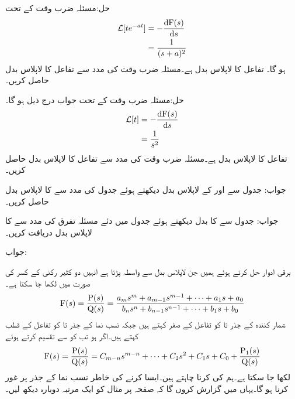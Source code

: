 حل:مسئلہ ضرب وقت کے  تحت
\begin{align*}
\Laplace[te^{-at}] &=-\frac{\dif \bF(s)}{\dif s}\\
&=\frac{1}{(s+a)^2}
\end{align*}
ہو گا۔
تفاعل  کا لاپلاس بدل  ہے۔مسئلہ ضرب وقت کی مدد سے تفاعل  کا  لاپلاس بدل حاصل کریں۔

حل:مسئلہ ضرب وقت کے تحت جواب درج ذیل ہو گا۔
\begin{align*}
\Laplace[t]&=-\frac{\dif \bF(s)}{\dif s}\\
&=\frac{1}{s^2}
\end{align*}
تفاعل  کا لاپلاس بدل  ہے۔مسئلہ ضرب وقت کی مدد سے تفاعل  کا لاپلاس بدل حاصل کریں۔

جواب:
جدول  سے  اور  کے لاپلاس بدل دیکھتے ہوئے جدول   کی مدد سے  کا لاپلاس بدل حاصل کریں۔

جواب:
جدول  سے  کا بدل دیکھتے ہوئے جدول   میں دئے مسئلہ تفرق کی مدد سے  کا لاپلاس بدل دریافت کریں۔

جواب:

برقی ادوار حل کرتے ہوئے ہمیں جن لاپلاس بدل سے واسطہ پڑتا ہے انہیں دو کثیر رکنی کے کسر کی صورت میں لکھا جا سکتا ہے۔
\begin{align}\label{مساوات_لاپلاس_عمومی_الف}
{\ensuremath{{\textup{F}}}}(s)=\frac{{{\textup{P}}}(s)}{{{\textup{Q}}}(s)}=\frac{a_m s^m+a_{m-1} s^{m-1}+\cdots+a_1 s+a_0}{b_n s^n+b_{n-1} s^{n-1}+\cdots+b_1 s+b_0}
\end{align}
شمار کنندہ  کے جذر  تا   کو تفاعل کے صفر کہتے ہیں جبکہ نسب نما  کے جذر   تا  کو تفاعل کے قطب کہتے ہیں۔اگر  ہو تب  کو  سے تقسیم کرتے ہوئے
\begin{align}\label{مساوات_لاپلاس_عمومی_ب}
{\ensuremath{{\textup{F}}}}(s)=\frac{{{\textup{P}}}(s)}{{{\textup{Q}}}(s)}=C_{m-n}s^{m-n}+\cdots+C_2 s^2+C_1 s+C_0+\frac{{{\textup{P}}}_1(s)}{{{\textup{Q}}}(s)}
\end{align}
لکھا جا سکتا ہے۔ہم  کی  کرنا چاہتے ہیں۔ایسا کرنے کی خاطر نسب نما  کے جذر پر غور کرنا ہو گا۔یہاں میں گزارش کروں گا کہ صفحہ  پر مثال  کو ایک مرتبہ دوبارہ دیکھ لیں۔

